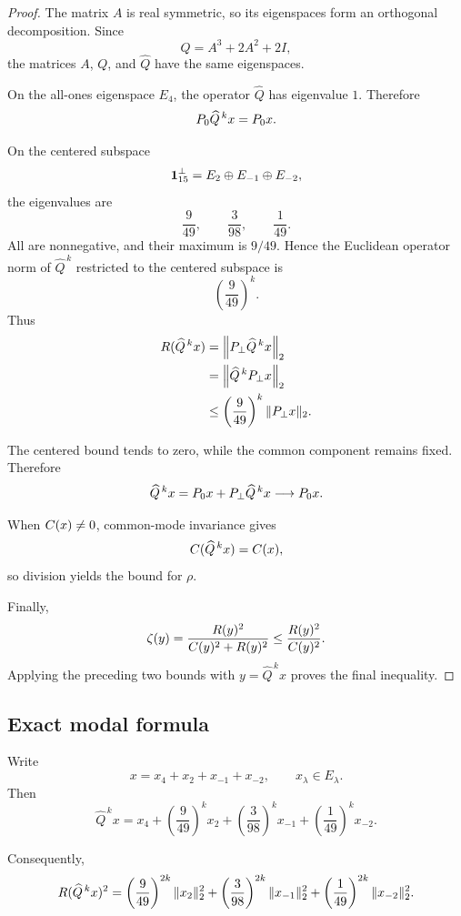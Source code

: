 \begin{proof}
The matrix \(A\) is real symmetric, so its eigenspaces form an
orthogonal decomposition.  Since
\[
Q=A^3+2A^2+2I,
\]
the matrices \(A\), \(Q\), and \(\widehat{Q}\) have the same
eigenspaces.

On the all-ones eigenspace \(E_4\), the operator
\(\widehat{Q}\) has eigenvalue \(1\).  Therefore
\[
P_{0}\widehat{Q}^{\,k}x
=
P_{0} x.
\]

On the centered subspace
\[
\mathbf{1}_{15}^{\perp}
=
E_2\oplus E_{-1}\oplus E_{-2},
\]
the eigenvalues are
\[
\frac{9}{49},
\qquad
\frac{3}{98},
\qquad
\frac{1}{49}.
\]
All are nonnegative, and their maximum is \(9/49\).  Hence the
Euclidean operator norm of
\(\widehat{Q}^{\,k}\) restricted to the centered subspace is
\[
\left(\frac{9}{49}\right)^k.
\]
Thus
\[
\begin{aligned}
R(\widehat{Q}^{\,k}x)
&=
\left\|
P_{\perp}\widehat{Q}^{\,k}x
\right\|_2\\
&=
\left\|
\widehat{Q}^{\,k}P_{\perp} x
\right\|_2\\
&\le
\left(\frac{9}{49}\right)^k
\|P_{\perp} x\|_2.
\end{aligned}
\]

The centered bound tends to zero, while the common component remains
fixed.  Therefore
\[
\widehat{Q}^{\,k}x
=
P_{0} x+P_{\perp}\widehat{Q}^{\,k}x
\longrightarrow
P_{0} x.
\]

When \(C(x)\neq0\), common-mode invariance gives
\[
C(\widehat{Q}^{\,k}x)
=
C(x),
\]
so division yields the bound for \(\rho\).

Finally,
\[
\zeta(y)
=
\frac{R(y)^2}
{C(y)^2+R(y)^2}
\le
\frac{R(y)^2}{C(y)^2}.
\]
Applying the preceding two bounds with
\(y=\widehat{Q}^{\,k}x\) proves the final inequality.
\end{proof}

\subsection{Exact modal formula}

Write
\[
x
=
x_4+x_2+x_{-1}+x_{-2},
\qquad
x_\lambda\in E_\lambda.
\]
Then
\[
\widehat{Q}^{\,k}x
=
x_4
+
\left(\frac{9}{49}\right)^k x_2
+
\left(\frac{3}{98}\right)^k x_{-1}
+
\left(\frac{1}{49}\right)^k x_{-2}.
\]

Consequently,
\[
R(\widehat{Q}^{\,k}x)^2
=
\left(\frac{9}{49}\right)^{2k}\|x_2\|_2^2
+
\left(\frac{3}{98}\right)^{2k}\|x_{-1}\|_2^2
+
\left(\frac{1}{49}\right)^{2k}\|x_{-2}\|_2^2.
\]

